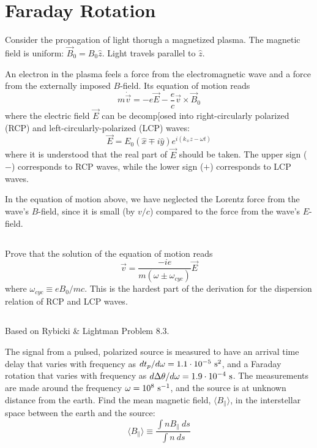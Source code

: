\documentclass[11pt]{article}
\begin{document}
\section{Faraday Rotation}

Consider the propagation of light thorugh a magnetized plasma.  The magnetic field is uniform: $\vec B_0=B_0\hat z$.
Light travels parallel to $\hat z$.

An electron in the plasma feels a force from the electromagnetic wave and a force from the externally imposed
$B$-field.  Its equation of motion reads
\begin{equation}
m\dot \vec v=-e\vec E-\frac{e}{c}\vec v\times \vec B_0
\end{equation}
where the electric field $\vec E$ can be decomp[osed into right-circularly polarized (RCP) and
left-circularly-polarized (LCP) waves:
\begin{equation}
\vec E=E_0(\hat x\mp i\hat y)e^{i(k_\mp z-\omega t)}
\end{equation}
where it is understood that the real part of $\vec E$ should be taken.  The upper sign ($-$) corresponds
to RCP waves, while the lower sign ($+$) corresponds to LCP waves.

In the equation of motion above, we have neglected the Lorentz force from the wave's
$B$-field, since it is small (by $v/c$) compared to the force from the wave's $E$-field.

\subsection{}
Prove that the solution of the equation of motion reads
\begin{equation}
\vec v=\frac{-ie}{m(\omega\pm\omega_{cyc})}\vec E
\end{equation}
where $\omega_{cyc}\equiv eB_0/mc$.  This is the hardest part of the derivation for the dispersion
relation of RCP and LCP waves.

\subsection{}
Based on Rybicki \& Lightman Problem 8.3.

The signal from a pulsed, polarized source is measured to have an arrival time delay that varies
with frequency as $dt_p/d\omega=1.1\cdot10^{-5}~{\rm s}^2$, and a Faraday rotation that
varies with frequency as $d\Delta\theta/d\omega=1.9\cdot10^{-4}~{\rm s}$.  The measurements are
made around the frequency $\omega=10^8~{\rm s}^{-1}$, and the source is at unknown distance from
the earth.  Find the mean magnetic field, $\langle B_\parallel\rangle$, in the interstellar space
between the earth and the source:
\begin{equation}
\langle B_\parallel\rangle\equiv\frac{\int{n B_\parallel~ds}}{\int{n~ds}}
\end{equation}
\end{document}
